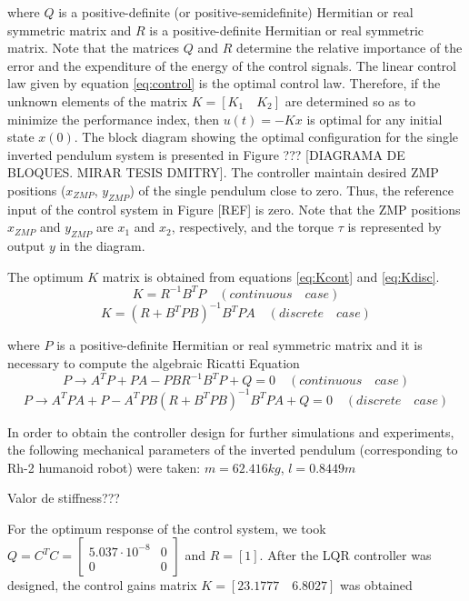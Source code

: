 where $Q$ is a positive-definite (or positive-semidefinite) Hermitian or real symmetric matrix and $R$ is a positive-definite Hermitian or real symmetric matrix. Note that the matrices $Q$ and $R$ determine the relative importance of the error and the expenditure of the energy of the control signals.
The linear control law given by equation \ref{eq:control} is the optimal control law. Therefore, if the unknown elements of the matrix $K = [K_1 \quad K_2]$ are determined so as to minimize the performance index, then $u(t) = -Kx$  is optimal for any initial state $x(0)$. The block diagram showing the optimal configuration for the single inverted pendulum system is presented in Figure ??? [DIAGRAMA DE BLOQUES. MIRAR TESIS DMITRY]. The controller maintain desired ZMP positions ($x_{ZMP}$, $y_{ZMP}$) of the single pendulum close to zero. Thus, the reference input of the control system in Figure [REF] is zero. Note that the ZMP positions $x_{ZMP}$ and $y_{ZMP}$ are $x_1$ and $x_2$, respectively, and the torque $\tau$ is represented by output $y$ in the diagram.

The optimum $K$ matrix is obtained from equations \ref{eq:Kcont} and \ref{eq:Kdisc}.
\begin{equation}
K = R^{-1}B^{T}P \quad (continuous \quad case)
\label{eq:Kcont}
\end{equation}
\begin{equation}
K = (R + B^{T}PB)^{-1}B^{T}PA \quad (discrete \quad case)
\label{eq:Kdisc}
\end{equation}

where $P$ is a positive-definite Hermitian or real symmetric matrix and it is necessary to compute the algebraic Ricatti Equation
\begin{equation}
P \rightarrow A^{T}P+PA-PBR^{-1}B^{T}P+Q = 0 \quad (continuous \quad case)
\end{equation}
\begin{equation}
P \rightarrow A^{T}PA+P-A^{T}PB(R+B^{T}PB)^{-1}B^{T}PA+Q = 0 \quad (discrete \quad case)
\end{equation}


In order to obtain the controller design for further simulations and experiments, the following mechanical parameters of the inverted pendulum (corresponding to Rh-2 humanoid robot) were taken: $m = 62.416 kg$, $l=0.8449 m$

Valor de stiffness???

For the optimum response of the control system, we took $Q = C^{T}C = \begin{bmatrix}
5.037 \cdot 10^{-8} & 0\\
0 & 0
\end{bmatrix}$ and $R = [1] $. After the LQR controller was designed, the control gains matrix $K = [23.1777 \quad 6.8027]$ was obtained









